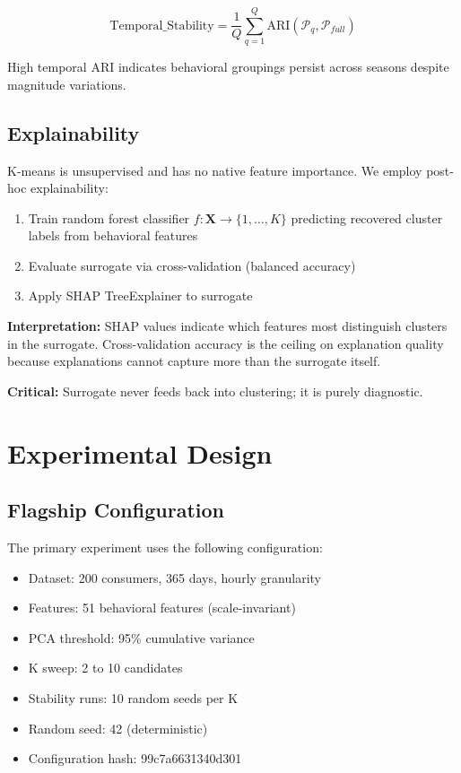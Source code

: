 \documentclass[11pt,a4paper]{article}
\begin{document}
\begin{equation}
\text{Temporal\_Stability} = \frac{1}{Q} \sum_{q=1}^{Q} \text{ARI}(\mathcal{P}_q, \mathcal{P}_{full})
\end{equation}

High temporal ARI indicates behavioral groupings persist across seasons despite magnitude variations.

\subsection{Explainability}
\label{sec:explainability}

K-means is unsupervised and has no native feature importance. We employ post-hoc explainability:

\begin{enumerate}
    \item Train random forest classifier $f: \mathbf{X} \rightarrow \{1, \ldots, K\}$ predicting recovered cluster labels from behavioral features
    \item Evaluate surrogate via cross-validation (balanced accuracy)
    \item Apply SHAP TreeExplainer \cite{lundberg2017shap} to surrogate
\end{enumerate}

\textbf{Interpretation:} SHAP values indicate which features most distinguish clusters in the surrogate. Cross-validation accuracy is the ceiling on explanation quality because explanations cannot capture more than the surrogate itself.

\textbf{Critical:} Surrogate never feeds back into clustering; it is purely diagnostic.

\section{Experimental Design}
\label{sec:experiments}

\subsection{Flagship Configuration}

The primary experiment uses the following configuration:

\begin{itemize}
    \item Dataset: 200 consumers, 365 days, hourly granularity
    \item Features: 51 behavioral features (scale-invariant)
    \item PCA threshold: 95\% cumulative variance
    \item K sweep: 2 to 10 candidates
    \item Stability runs: 10 random seeds per K
    \item Random seed: 42 (deterministic)
    \item Configuration hash: 99c7a6631340d301
\end{itemize}
\end{document}
